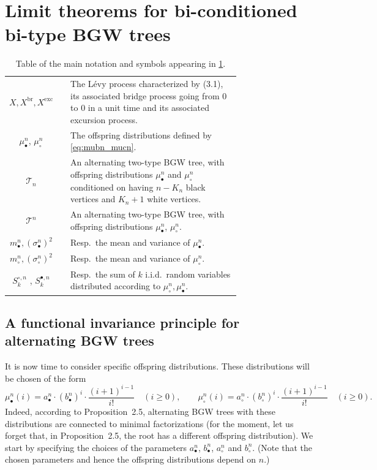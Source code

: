 \documentclass[11pt]{article}
\theoremstyle{definition}
\numberwithin{equation}{section}
\numberwithin{figure}{section}
\numberwithin{table}{section}
\def\abn{a_{\bullet}^{n}}
\def\acn{a_{\circ}^{n}}
\def\bbn{b_{\bullet}^{n}}
\def\bcn{b_{\circ}^{n}}
\def\mubn{\mu_{\bullet}^{n}}
\def\mucn{\mu_{\circ}^{n}}
\def\mbn{m_{\bullet}^{n}}
\def\mcn{m_{\circ}^{n}}
\def\scn{\sigma_{\circ}^{n}}
\def\sbn{\sigma_{\bullet}^{n}}
\def\Sbn{S^{\bullet,n}}
\def\Scn{S^{\circ,n}}
\def \Xexc{X^{\mathrm{exc}}}
\def \Xbr{X^{\mathrm{br}}}
\begin{document}
\section{Limit theorems for bi-conditioned bi-type BGW trees}
\label{sec:limitheorems}


\begin{table}[htbp]\caption{Table of the main notation and symbols appearing in \cref{sec:limitheorems}.}
\centering
\begin{tabular}{c c p{0.75 \linewidth} }
\toprule
$X, \Xbr,\Xexc$ && The L\'evy process characterized by (3.1),  its associated  bridge process going from $0$ to $0$ in a unit time and its associated excursion process.\\
$\mubn$, $\mucn$&& The offspring distributions defined by \eqref{eq:mubn_mucn}.\\
$\mathscr{T}_{n}$ & & An alternating two-type BGW tree, with offspring distributions $\mubn$ and $\mucn$ conditioned on having $n-K_{n}$ black vertices and $K_{n}+1$ white vertices.
 \\
 $\mathscr{T}^{n}$ & & An alternating two-type BGW tree, with offspring distributions $\mubn$, $\mucn$.\\
 $\mbn,(\sbn)^{2}$ & & Resp.~the mean and variance of $\mubn$.\\
 $ \mcn,(\scn)^{2}$ & & Resp.~the mean and variance of $\mucn$.\\
 $\Scn_{k}$ , $\Sbn_{k}$ && Resp.~the sum of $k$ i.i.d.\ random variables distributed according to $\mucn,\mubn$.\\
\bottomrule
\end{tabular}
\label{tab:seclim}
\end{table}
\setcounter{subsection}{2}\setcounter{theo}{4}\setcounter{equation}{9}
\subsection{A functional invariance principle for alternating BGW trees}
\label{ss:inv}

It is now time to consider specific offspring distributions.
These distributions will be chosen of the form
\begin{equation}
  \mubn(i)= \abn \cdot  (\bbn)^{i} \cdot \frac{(i+1)^{i-1}}{i!}  \quad (i \geq 0), \qquad \mucn(i)= \acn \cdot  (\bcn)^{i} \cdot \frac{(i+1)^{i-1}}{i!}  \quad (i \geq 0).
  \label{eq:mubn_mucn}
\end{equation}
Indeed, according to Proposition~2.5,
alternating BGW trees with these distributions are connected to minimal factorizations
(for the moment, let us forget that, in Proposition~2.5, the root has a different offspring distribution).
We start by specifying the choices of the parameters
$\abn$, $\bbn$, $\acn$ and $\bcn$.
(Note that the chosen parameters and hence the offspring distributions depend on $n$.)
\end{document}
